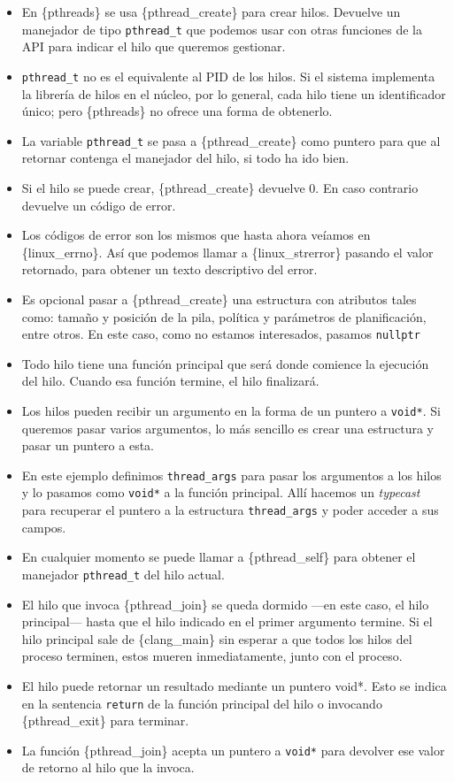 \begin{itemize}
\item
  En \{pthreads\} se usa \{pthread\_create\} para crear hilos. Devuelve
  un manejador de tipo \texttt{pthread\_t} que podemos usar con otras
  funciones de la API para indicar el hilo que queremos gestionar.
\item
  \texttt{pthread\_t} no es el equivalente al PID de los hilos. Si el
  sistema implementa la librería de hilos en el núcleo, por lo general,
  cada hilo tiene un identificador único; pero \{pthreads\} no ofrece
  una forma de obtenerlo.
\item
  La variable \texttt{pthread\_t} se pasa a \{pthread\_create\} como
  puntero para que al retornar contenga el manejador del hilo, si todo
  ha ido bien.
\item
  Si el hilo se puede crear, \{pthread\_create\} devuelve 0. En caso
  contrario devuelve un código de error.
\item
  Los códigos de error son los mismos que hasta ahora veíamos en
  \{linux\_errno\}. Así que podemos llamar a \{linux\_strerror\} pasando
  el valor retornado, para obtener un texto descriptivo del error.
\item
  Es opcional pasar a \{pthread\_create\} una estructura con atributos
  tales como: tamaño y posición de la pila, política y parámetros de
  planificación, entre otros. En este caso, como no estamos interesados,
  pasamos \texttt{nullptr}
\item
  Todo hilo tiene una función principal que será donde comience la
  ejecución del hilo. Cuando esa función termine, el hilo finalizará.
\item
  Los hilos pueden recibir un argumento en la forma de un puntero a
  \texttt{void*}. Si queremos pasar varios argumentos, lo más sencillo
  es crear una estructura y pasar un puntero a esta.
\item
  En este ejemplo definimos \texttt{thread\_args} para pasar los
  argumentos a los hilos y lo pasamos como \texttt{void*} a la función
  principal. Allí hacemos un \emph{typecast} para recuperar el puntero a
  la estructura \texttt{thread\_args} y poder acceder a sus campos.
\item
  En cualquier momento se puede llamar a \{pthread\_self\} para obtener
  el manejador \texttt{pthread\_t} del hilo actual.
\item
  El hilo que invoca \{pthread\_join\} se queda dormido ---en este caso,
  el hilo principal--- hasta que el hilo indicado en el primer argumento
  termine. Si el hilo principal sale de \{clang\_main\} sin esperar a
  que todos los hilos del proceso terminen, estos mueren inmediatamente,
  junto con el proceso.
\item
  El hilo puede retornar un resultado mediante un puntero
  \textquotesingle void*\textquotesingle. Esto se indica en la sentencia
  \texttt{return} de la función principal del hilo o invocando
  \{pthread\_exit\} para terminar.
\item
  La función \{pthread\_join\} acepta un puntero a \texttt{void*} para
  devolver ese valor de retorno al hilo que la invoca.
\end{itemize}

